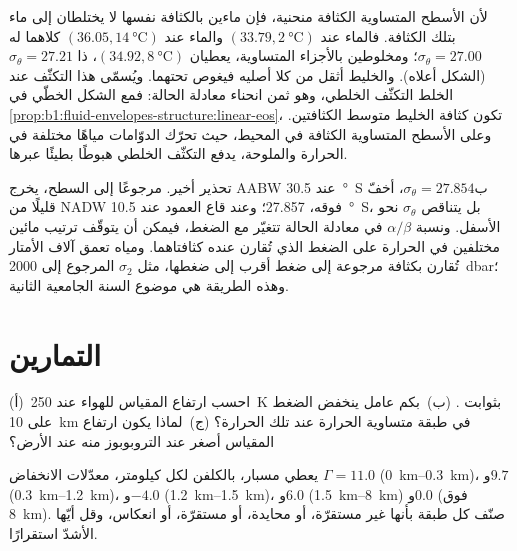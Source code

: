لأن الأسطح المتساوية الكثافة منحنية، فإن ماءين بالكثافة نفسها لا يختلطان إلى ماء بتلك الكثافة. فالماء عند $(33.79, \qty{2}{\celsius})$ والماء عند $(36.05, \qty{14}{\celsius})$ كلاهما له $\sigma_\theta = 27.00$؛ ومخلوطين بالأجزاء المتساوية، يعطيان $(34.92, \qty{8}{\celsius})$، ذا $\sigma_\theta = 27.21$ (الشكل أعلاه). والخليط أثقل من كلا أصليه فيغوص تحتهما. ويُسمّى هذا التكثّف عند الخلط التكثّف الخلطي، وهو ثمن انحناء معادلة الحالة: فمع الشكل الخطّي في \cref{prop:b1:fluid-envelopes-structure:linear-eos}، تكون كثافة الخليط متوسط الكثافتين. وعلى الأسطح المتساوية الكثافة في المحيط، حيث تحرّك الدوّامات مياهًا مختلفة في الحرارة والملوحة، يدفع التكثّف الخلطي هبوطًا بطيئًا عبرها.

تحذير أخير. مرجوعًا إلى السطح، يخرج AABW عند \qty{30.5}{\degree S} ب$\sigma_\theta = 27.854$، أخفّ قليلًا من NADW فوقه، \num{27.857}؛ وعند قاع العمود عند \qty{10.5}{\degree S}، بل يتناقص $\sigma_\theta$ نحو الأسفل. ونسبة $\alpha/\beta$ في معادلة الحالة تتغيّر مع الضغط، فيمكن أن يتوقّف ترتيب مائين مختلفين في الحرارة على الضغط الذي تُقارن عنده كثافتاهما. ومياه تعمق آلاف الأمتار تُقارن بكثافة مرجوعة إلى ضغط أقرب إلى ضغطها، مثل $\sigma_2$ المرجوع إلى \qty{2000}{dbar}؛ وهذه الطريقة هي موضوع السنة الجامعية الثانية.

\section{التمارين}

\begin{exercise}[$\star$]\label{exo:b1:fluid-envelopes-structure:1}
(أ)~احسب ارتفاع المقياس للهواء عند \qty{250}{K} بثوابت . (ب)~بكم عامل ينخفض الضغط على \qty{10}{km} في طبقة متساوية الحرارة عند تلك الحرارة؟ (ج)~لماذا يكون ارتفاع المقياس أصغر عند التروبوبوز منه عند الأرض؟
\end{exercise}

\begin{exercise}[$\star$]\label{exo:b1:fluid-envelopes-structure:2}
يعطي مسبار، بالكلفن لكل كيلومتر، معدّلات الانخفاض $\Gamma = 11.0$ (\qtyrange{0}{0.3}{km})، و$9.7$ (\qtyrange{0.3}{1.2}{km})، و$-4.0$ (\qtyrange{1.2}{1.5}{km})، و$6.0$ (\qtyrange{1.5}{8}{km}) و$0.0$ (فوق \qty{8}{km}). صنّف كل طبقة بأنها غير مستقرّة، أو محايدة، أو مستقرّة، أو انعكاس، وقل أيّها الأشدّ استقرارًا.
\end{exercise}

